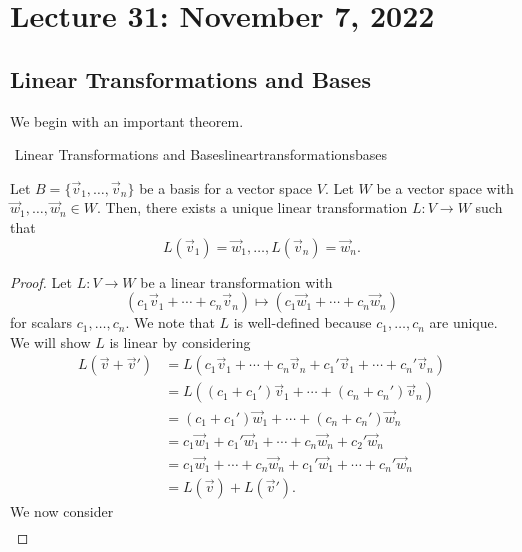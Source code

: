 \section{Lecture 31: November 7, 2022}

    \subsection{Linear Transformations and Bases}

        We begin with an important theorem.
        \begin{theorem}{\Stop\,\,Linear Transformations and Bases}{lineartransformationsbases}

            Let \(B=\{\vec{v}_1,\ldots,\vec{v}_n\}\) be a basis for a vector space \(V\). Let \(W\) be a vector space with \(\vec{w}_1,\ldots,\vec{w}_n\in W\). Then, there exists a unique linear transformation \(L:V\to W\) such that
            \begin{equation*}
                L(\vec{v}_1)=\vec{w}_1,\ldots,L(\vec{v}_n)=\vec{w}_n.
            \end{equation*}
            \begin{proof}
                Let \(L:V\to W\) be a linear transformation with
                \begin{equation*}
                    (c_1\vec{v}_1+\cdots+c_n\vec{v}_n)\mapsto(c_1\vec{w}_1+\cdots+c_n\vec{w}_n)
                \end{equation*}
                for scalars \(c_1,\ldots,c_n\). We note that \(L\) is well-defined because \(c_1,\ldots,c_n\) are unique. We will show \(L\) is linear by considering
                \begin{align*}
                    L(\vec{v}+\vec{v}')&=L(c_1\vec{v}_1+\cdots+c_n\vec{v}_n+c_1'\vec{v}_1+\cdots+c_n'\vec{v}_n) \\
                    &=L((c_1+c_1')\vec{v}_1+\cdots+(c_n+c_n')\vec{v}_n) \\
                    &=(c_1+c_1')\vec{w}_1+\cdots+(c_n+c_n')\vec{w}_n \\
                    &=c_1\vec{w}_1+c_1'\vec{w}_1+\cdots+c_n\vec{w}_n+c_2'\vec{w}_n \\
                    &=c_1\vec{w}_1+\cdots+c_n\vec{w}_n+c_1'\vec{w}_1+\cdots+c_n'\vec{w}_n \\
                    &=L(\vec{v})+L(\vec{v}').
                \end{align*}
                We now consider
                \begin{align*}

\end{align*}
\end{proof}
\end{theorem}
